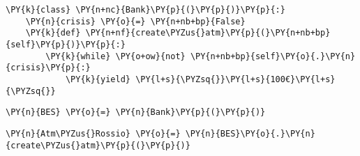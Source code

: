 {\par%
\vspace{-1\baselineskip}%
}%
\begin{notebookcell}[10]%
\begin{addmargin}[\cellleftmargin]{0em}%
{\smaller%
\par%
%
\vspace{-1\smallerfontscale}%
\begin{Verbatim}[commandchars=\\\{\}]
\PY{k}{class} \PY{n+nc}{Bank}\PY{p}{(}\PY{p}{)}\PY{p}{:}
    \PY{n}{crisis} \PY{o}{=} \PY{n+nb+bp}{False}
    \PY{k}{def} \PY{n+nf}{create\PYZus{}atm}\PY{p}{(}\PY{n+nb+bp}{self}\PY{p}{)}\PY{p}{:}
        \PY{k}{while} \PY{o+ow}{not} \PY{n+nb+bp}{self}\PY{o}{.}\PY{n}{crisis}\PY{p}{:}
            \PY{k}{yield} \PY{l+s}{\PYZsq{}}\PY{l+s}{100€}\PY{l+s}{\PYZsq{}}
\end{Verbatim}
%
\par%
\vspace{-1\smallerfontscale}}%
\end{addmargin}
\end{notebookcell}



{\par%
\vspace{-1\baselineskip}%
}%
\begin{notebookcell}[11]%
\begin{addmargin}[\cellleftmargin]{0em}%
{\smaller%
\par%
%
\vspace{-1\smallerfontscale}%
\begin{Verbatim}[commandchars=\\\{\}]
\PY{n}{BES} \PY{o}{=} \PY{n}{Bank}\PY{p}{(}\PY{p}{)}
\end{Verbatim}
%
\par%
\vspace{-1\smallerfontscale}}%
\end{addmargin}
\end{notebookcell}



{\par%
\vspace{-1\baselineskip}%
}%
\begin{notebookcell}[12]%
\begin{addmargin}[\cellleftmargin]{0em}%
{\smaller%
\par%
%
\vspace{-1\smallerfontscale}%
\begin{Verbatim}[commandchars=\\\{\}]
\PY{n}{Atm\PYZus{}Rossio} \PY{o}{=} \PY{n}{BES}\PY{o}{.}\PY{n}{create\PYZus{}atm}\PY{p}{(}\PY{p}{)}
\end{Verbatim}
%
\par%
\vspace{-1\smallerfontscale}}%
\end{addmargin}
\end{notebookcell}


